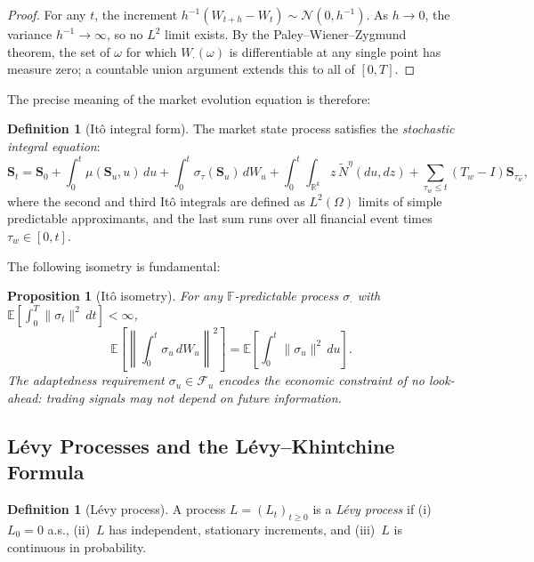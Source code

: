 \documentclass[12pt,a4paper]{article}
\theoremstyle{plain}
\newtheorem{proposition}[theorem]{Proposition}
\theoremstyle{definition}
\newtheorem{definition}[theorem]{Definition}
\newcommand{\R}{\mathbb{R}}
\newcommand{\E}{\mathbb{E}}
\newcommand{\F}{\mathcal{F}}
\newcommand{\1}{\mathbbm{1}}
\begin{document}
\begin{proof}
For any $t$, the increment $h^{-1}(W_{t+h} - W_t) \sim \mathcal{N}(0,h^{-1})$.
As $h \to 0$, the variance $h^{-1} \to \infty$, so no $L^2$ limit exists.
By the Paley--Wiener--Zygmund theorem, the set of $\omega$ for which $W_\cdot(\omega)$
is differentiable at any single point has measure zero; a countable union
argument extends this to all of $[0,T]$.
\end{proof}

The precise meaning of the market evolution equation is therefore:

\begin{definition}[Itô integral form]
\label{def:ito_integral}
The market state process satisfies the \emph{stochastic integral equation}:
\begin{equation}
\label{eq:full_sde}
\mathbf{S}_t = \mathbf{S}_0
  + \int_0^t \mu(\mathbf{S}_u, u)\,du
  + \int_0^t \sigma_\tau(\mathbf{S}_u)\,dW_u
  + \int_0^t\!\!\int_{\R^k} z\,\tilde{N}^\eta(du,dz)
  + \sum_{\tau_w \leq t} (T_w - I)\mathbf{S}_{\tau_w^-},
\end{equation}
where the second and third Itô integrals are defined as $L^2(\Omega)$ limits of
simple predictable approximants, and the last sum runs over all financial event
times $\tau_w \in [0,t]$.
\end{definition}

The following isometry is fundamental:

\begin{proposition}[Itô isometry]
For any $\mathbb{F}$-predictable process $\sigma_\cdot$ with
$\E[\int_0^T \|\sigma_t\|^2\,dt] < \infty$,
\[
\E\!\left[\left\|\int_0^t \sigma_u\,dW_u\right\|^2\right]
= \E\!\left[\int_0^t \|\sigma_u\|^2\,du\right].
\]
The adaptedness requirement $\sigma_u \in \F_u$ encodes the economic
constraint of \emph{no look-ahead}: trading signals may not depend on
future information.
\end{proposition}

\subsection{Lévy Processes and the Lévy--Khintchine Formula}

\begin{definition}[Lévy process]
A process $L = (L_t)_{t \geq 0}$ is a \emph{Lévy process} if
(i)~$L_0 = 0$ a.s., (ii)~$L$ has independent, stationary increments,
and (iii)~$L$ is continuous in probability.
\end{definition}
\end{document}
